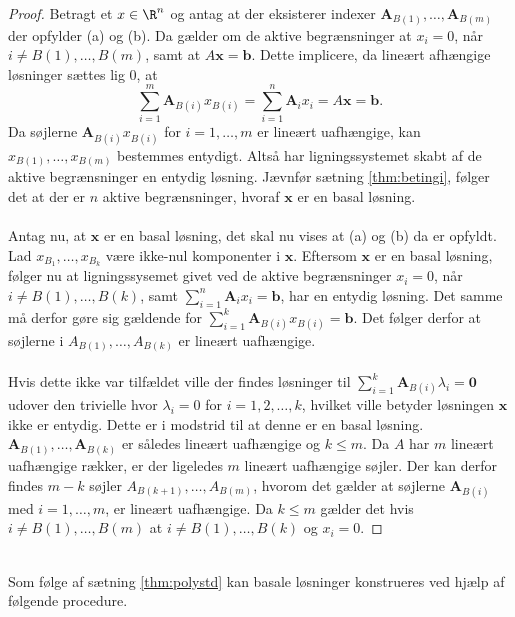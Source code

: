 \begin{proof}
Betragt et $x \in \R^n$ og antag at der eksisterer indexer $\mathbf{A}_{B(1)},\ldots,\mathbf{A}_{B(m)}$ der opfylder (a) og (b).
Da gælder om de aktive begrænsninger at $x_i=0$, når $i\neq B(1),\ldots,B(m)$, samt at $A\mathbf{x}=\mathbf{b}$.
Dette implicere, da lineært afhængige løsninger sættes lig $0$,  at 
%
$$\sum_{i=1}^{m}\textbf{A}_{B(i)}x_{B(i)}=\sum_{i=1}^{n}\textbf{A}_ix_i=A\textbf{x}=\textbf{b}.$$
%
Da søjlerne $\textbf{A}_{B(i)}x_{B(i)}$ for $i=1,\ldots,m$ er lineært uafhængige, kan $x_{B(1)},\ldots,x_{B(m)}$ bestemmes entydigt. 
Altså har ligningssystemet skabt af de aktive begrænsninger en entydig løsning.
Jævnfør sætning \ref{thm:betingi}, 
følger det at der er $n$ aktive begrænsninger, hvoraf $\mathbf{x}$ er en basal løsning. 
\\\\
%
%
Antag nu, at $\mathbf{x}$ er en basal løsning, det skal nu vises at (a) og (b) da er opfyldt.
Lad $x_{B_1},\ldots,x_{B_k}$ være ikke-nul komponenter i $\textbf{x}$.
Eftersom $\mathbf{x}$ er en basal løsning, følger nu at ligningssysemet givet ved de aktive begrænsninger $x_i=0$, når $i\neq B(1),\ldots,B(k)$, samt  $\sum_{i=1}^{n}\mathbf{A}_ix_i=\mathbf{b}$, har en entydig løsning. 
Det samme må derfor gøre sig gældende for $\sum_{i=1}^{k}\mathbf{A}_{B(i)}x_{B(i)}=\mathbf{b}$.
Det følger derfor at søjlerne i $A_{B(1)},\ldots,A_{B(k)}$ er lineært uafhængige.
\\\\
%
Hvis dette ikke var tilfældet ville der findes løsninger til $\sum_{i=1}^{k}\mathbf{A}_{B(i)} \lambda_i=\mathbf{0}$ udover den trivielle hvor $\lambda_i=0$ for $i=1,2,\ldots,k$, hvilket ville betyder løsningen $\mathbf{x}$ ikke er entydig. 
Dette er i modstrid til at denne er en basal løsning.
$\mathbf{A}_{B(1)},\ldots ,\mathbf{A}_{B(k)}$ er således lineært uafhængige og $k \leq m$.
Da $A$ har $m$ lineært uafhængige rækker, er der ligeledes $m$ lineært uafhængige søjler.
Der kan derfor findes $m-k$ søjler $A_{B(k+1)},\ldots,A_{B(m)}$, hvorom det gælder at søjlerne $\mathbf{A}_{B(i)}$ med $i=1,\ldots,m$, er lineært uafhængige.
Da $k \leq m$ gælder det hvis $i \neq B(1),\ldots,B(m)$ at $i \neq B(1),\ldots,B(k)$ og $x_i=0$.
%
\end{proof}
\\
\noindent
Som følge af sætning \ref{thm:polystd} kan basale løsninger konstrueres ved hjælp af følgende procedure.
